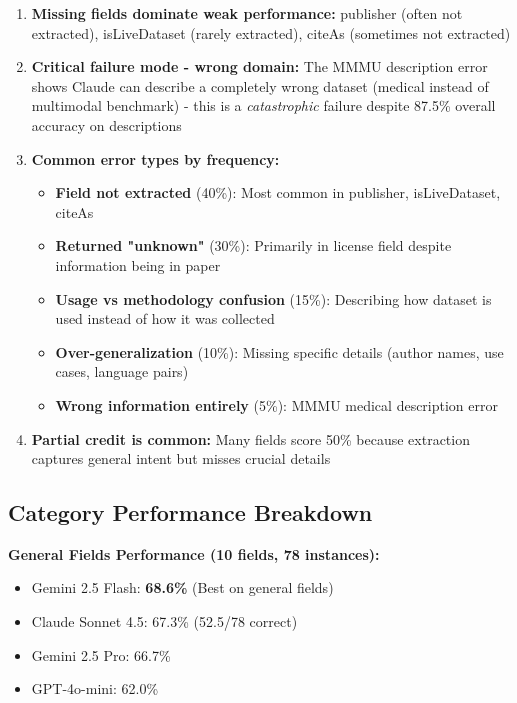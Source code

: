 \documentclass[11pt,a4paper]{article}
\begin{document}
\begin{enumerate}
    \item \textbf{Missing fields dominate weak performance:} publisher (often not extracted), isLiveDataset (rarely extracted), citeAs (sometimes not extracted)

    \item \textbf{Critical failure mode - wrong domain:} The MMMU description error shows Claude can describe a completely wrong dataset (medical instead of multimodal benchmark) - this is a \textit{catastrophic} failure despite 87.5\% overall accuracy on descriptions

    \item \textbf{Common error types by frequency:}
    \begin{itemize}
        \item \textbf{Field not extracted} (40\%): Most common in publisher, isLiveDataset, citeAs
        \item \textbf{Returned "unknown"} (30\%): Primarily in license field despite information being in paper
        \item \textbf{Usage vs methodology confusion} (15\%): Describing how dataset is used instead of how it was collected
        \item \textbf{Over-generalization} (10\%): Missing specific details (author names, use cases, language pairs)
        \item \textbf{Wrong information entirely} (5\%): MMMU medical description error
    \end{itemize}

    \item \textbf{Partial credit is common:} Many fields score 50\% because extraction captures general intent but misses crucial details
\end{enumerate}

\subsection{Category Performance Breakdown}

\textbf{General Fields Performance (10 fields, 78 instances):}
\begin{itemize}[leftmargin=*]
    \item Gemini 2.5 Flash: \textbf{68.6\%} (Best on general fields)
    \item Claude Sonnet 4.5: 67.3\% (52.5/78 correct)
    \item Gemini 2.5 Pro: 66.7\%
    \item GPT-4o-mini: 62.0\%
\end{itemize}
\end{document}
